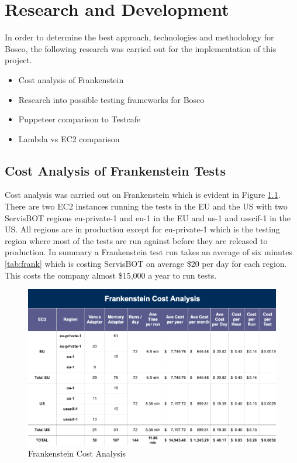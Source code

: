 \documentclass[12pt,a4paper,titlepage]{report}
\begin{document}
\chapter{Research and Development}

In order to determine the best approach, technologies and methodology for Bosco, the following research was carried out for the implementation of this project.

\begin{itemize}
 \item Cost analysis of Frankenstein
 \item Research into possible testing frameworks for Bosco
 \item Puppeteer comparison to Testcafe
 \item Lambda vs EC2 comparison
\end{itemize}

\section{Cost Analysis of Frankenstein Tests}

Cost analysis was carried out on Frankenstein which is evident in Figure \ref{frank:cost}. There are two EC2 instances running the tests in the EU and the US with two ServisBOT regions eu-private-1 and eu-1 in the EU and us-1 and usscif-1 in the US. 
All regions are in production except for eu-private-1 which is the testing region where most of the tests are run against before they are released to production. 
In summary a Frankenstein test run takes an average of six minutes \ref{tab:frank} which is costing ServisBOT on average \$20 per day for each region. 
This costs the company almost \$15,000 a year to run tests.

\begin{figure}[H]
 \centering
 \includegraphics[width=\textwidth,height=\textheight,keepaspectratio]{./diagrams/frank_cost_analysis.png}
 \caption{Frankenstein Cost Analysis}
 \label{frank:cost}
\end{figure}
\end{document}
